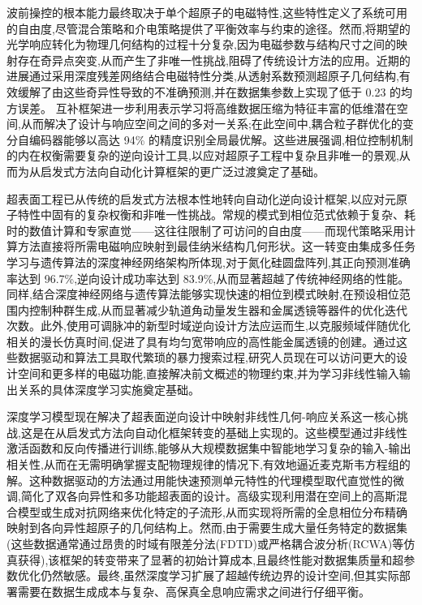 波前操控的根本能力最终取决于单个超原子的电磁特性,这些特性定义了系统可用的自由度,尽管混合策略和介电策略提供了平衡效率与约束的途径。然而,将期望的光学响应转化为物理几何结构的过程十分复杂,因为电磁参数与结构尺寸之间的映射存在奇异点突变,从而产生了非唯一性挑战,阻碍了传统设计方法的应用。近期的进展通过采用深度残差网络结合电磁特性分类,从透射系数预测超原子几何结构,有效缓解了由这些奇异性导致的不准确预测,并在数据集参数上实现了低于 0.23 的均方误差。\citep{doi_10_1109_iccem60619_2024_10559188_c3199408} \citep{doi_10_1109_isctis58954_2023_10213114_7fee3b45} 互补框架进一步利用表示学习将高维数据压缩为特征丰富的低维潜在空间,从而解决了设计与响应空间之间的多对一关系;在此空间中,耦合粒子群优化的变分自编码器能够以高达 94\% 的精度识别全局最优解。这些进展强调,相位控制机制的内在权衡需要复杂的逆向设计工具,以应对超原子工程中复杂且非唯一的景观,从而为从启发式方法向自动化计算框架的更广泛过渡奠定了基础。\citep{doi_10_1109_iccem60619_2024_10559188_c3199408} \citep{doi_10_2139_ssrn_4082312_28ca582d}

超表面工程已从传统的启发式方法根本性地转向自动化逆向设计框架,以应对元原子特性中固有的复杂权衡和非唯一性挑战。常规的模式到相位范式依赖于复杂、耗时的数值计算和专家直觉------这往往限制了可访问的自由度------而现代策略采用计算方法直接将所需电磁响应映射到最佳纳米结构几何形状。这一转变由集成多任务学习与遗传算法的深度神经网络架构所体现,对于氮化硅圆盘阵列,其正向预测准确率达到 96.7\%,逆向设计成功率达到 83.9\%,从而显著超越了传统神经网络的性能。同样,结合深度神经网络与遗传算法能够实现快速的相位到模式映射,在预设相位范围内控制种群生成,从而显著减少轨道角动量发生器和金属透镜等器件的优化迭代次数。此外,使用可调脉冲的新型时域逆向设计方法应运而生,以克服频域伴随优化相关的漫长仿真时间,促进了具有均匀宽带响应的高性能金属透镜的创建。通过这些数据驱动和算法工具取代繁琐的暴力搜索过程,研究人员现在可以访问更大的设计空间和更多样的电磁功能,直接解决前文概述的物理约束,并为学习非线性输入输出关系的具体深度学习实施奠定基础。\citep{doi_10_1016_j_rio_2026_100988_b00ee173} \citep{doi_10_1364_oe_478084_bf365dc5} \citep{doi_10_1109_apmc60911_2024_10867828_7c3f3b13}

深度学习模型现在解决了超表面逆向设计中映射非线性几何-响应关系这一核心挑战,这是在从启发式方法向自动化框架转变的基础上实现的。这些模型通过非线性激活函数和反向传播进行训练,能够从大规模数据集中智能地学习复杂的输入-输出相关性,从而在无需明确掌握支配物理规律的情况下,有效地逼近麦克斯韦方程组的解。这种数据驱动的方法通过用能快速预测单元特性的代理模型取代直觉性的微调,简化了双各向异性和多功能超表面的设计。高级实现利用潜在空间上的高斯混合模型或生成对抗网络来优化特定的子流形,从而实现将所需的全息相位分布精确映射到各向异性超原子的几何结构上。然而,由于需要生成大量任务特定的数据集(这些数据通常通过昂贵的时域有限差分法(FDTD)或严格耦合波分析(RCWA)等仿真获得),该框架的转变带来了显著的初始计算成本,且最终性能对数据集质量和超参数优化仍然敏感。最终,虽然深度学习扩展了超越传统边界的设计空间,但其实际部署需要在数据生成成本与复杂、高保真全息响应需求之间进行仔细平衡。\citep{doi_10_1515_nanoph_2019_0474_d2187501} \citep{doi_10_48550_arxiv_2204_00433_1c5cfd3e} \citep{doi_10_3390_photonics12100947_b44bdefd}

